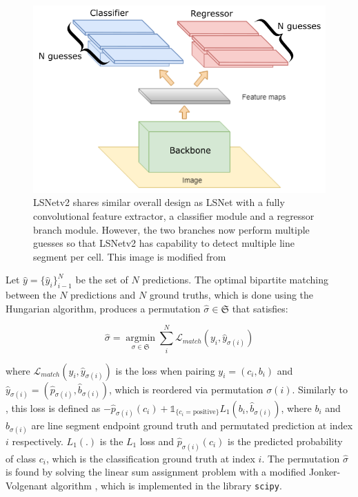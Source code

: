 \documentclass[journal]{IEEEtran}
\begin{document}
\begin{figure}
  \includegraphics[width=\linewidth]{imgs/others/2.png}
  \caption{LSNetv2 shares similar overall design as LSNet with a fully convolutional feature extractor, a classifier module and a regressor branch module. However, the two branches now perform multiple guesses so that LSNetv2 has capability to detect multiple line segment per cell. This image is modified from \cite{Nguyen2020}}
  \label{lsnet_architecture}
\end{figure}

Let $\hat{y}=\{\hat{y}_i\}^N_{i-1}$ be the set of $N$ predictions. The optimal bipartite matching between the $N$ predictions and $N$ ground truths, which is done using the Hungarian algorithm, produces a permutation $\hat{\sigma} \in \mathfrak{S}$ that satisfies:

\begin{equation} \label{bipartite_eqn}
\hat{\sigma} = \mathop{\arg \min}\limits_{\sigma \in \mathfrak{S}} \sum_i^N \mathcal{L}_{match} (y_i, \hat{y}_{\sigma(i)})
\end{equation}

where $\mathcal{L}_{match} (y_i, \hat{y}_{\sigma(i)})$ is the loss when pairing $y_i = (c_i, b_i)$ and $\hat{y}_{\sigma(i)} = (\hat{p}_{\sigma(i)}, \hat{b}_{\sigma(i)})$, which is reordered via permutation $\sigma(i)$. Similarly to \cite{DETR}, this loss is defined as $-\hat{p}_{\sigma(i)}(c_i) + \mathds{1}_{\{c_i=\text{positive}\}}L_1(b_i, \hat{b}_{\sigma(i)})$, where $b_i$ and $\hat{b}_{\sigma(i)}$ are line segment endpoint ground truth and permutated prediction at index $i$ respectively. $L_1(.)$ is the $L_1$ loss and $\hat{p}_{\sigma(i)}(c_i)$ is the predicted probability of class $c_i$, which is the classification ground truth at index $i$. The permutation $\hat{\sigma}$ is found by solving the linear sum assignment problem with a modified Jonker-Volgenant algorithm \cite{7738348}, which is implemented in the library \texttt{scipy}.
\end{document}
